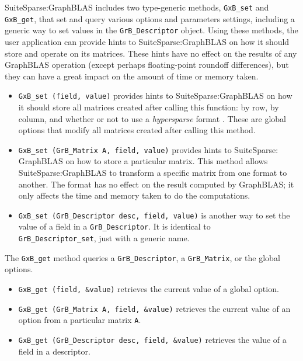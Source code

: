 \documentclass[12pt]{article}
\begin{document}
SuiteSparse:GraphBLAS includes two type-generic methods, \verb'GxB_set' and
\verb'GxB_get', that set and query various options and parameters settings,
including a generic way to set values in the \verb'GrB_Descriptor' object.
Using these methods, the user application can provide hints to
SuiteSparse:GraphBLAS on how it should store and operate on its matrices.
These hints have no effect on the results of any GraphBLAS operation (except
perhaps floating-point roundoff differences), but they can have a great impact
on the amount of time or memory taken.

\begin{itemize}

\item \verb'GxB_set (field, value)' provides hints to
    SuiteSparse:GraphBLAS on how it should store all matrices created after
    calling this function:  by row, by column, and whether or not to use a {\em
    hypersparse} format \cite{BulucGilbert08,BulucGilbert12}.  These are global
    options that modify all matrices created after calling this method.

\item \verb'GxB_set (GrB_Matrix A, field, value)' provides hints to
    SuiteSparse: GraphBLAS on how to store a particular matrix.  This method
    allows SuiteSparse:GraphBLAS to transform a specific matrix from one format
    to another.  The format has no effect on the result computed by GraphBLAS;
    it only affects the time and memory taken to do the computations.

\item \verb'GxB_set (GrB_Descriptor desc, field, value)' is another way to
    set the value of a field in a \verb'GrB_Descriptor'.  It is identical to \\
    \verb'GrB_Descriptor_set', just with a generic name. 

\end{itemize}

The \verb'GxB_get' method queries a \verb'GrB_Descriptor', a \verb'GrB_Matrix',
or the global options.

\begin{itemize}

\item \verb'GxB_get (field, &value)' retrieves the current value of
    a global option.

\item \verb'GxB_get (GrB_Matrix A, field, &value)' retrieves the current
    value of an option from a particular matrix \verb'A'.

\item \verb'GxB_get (GrB_Descriptor desc, field, &value)' retrieves the value
    of a field in a descriptor.

\end{itemize}
\end{document}
